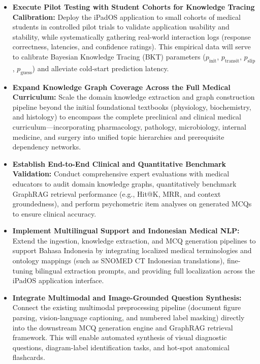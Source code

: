 \begin{itemize}
    \item \textbf{Execute Pilot Testing with Student Cohorts for Knowledge Tracing Calibration:}
          Deploy the iPadOS application to small cohorts of medical students in controlled pilot trials to validate application usability and stability, while systematically gathering real-world interaction logs (response correctness, latencies, and confidence ratings). This empirical data will serve to calibrate Bayesian Knowledge Tracing (BKT) parameters ($p_{\text{init}}$, $p_{\text{transit}}$, $p_{\text{slip}}$, $p_{\text{guess}}$) and alleviate cold-start prediction latency.

    \item \textbf{Expand Knowledge Graph Coverage Across the Full Medical Curriculum:}
          Scale the domain knowledge extraction and graph construction pipeline beyond the initial foundational textbooks (physiology, biochemistry, and histology) to encompass the complete preclinical and clinical medical curriculum---incorporating pharmacology, pathology, microbiology, internal medicine, and surgery into unified topic hierarchies and prerequisite dependency networks.

    \item \textbf{Establish End-to-End Clinical and Quantitative Benchmark Validation:}
          Conduct comprehensive expert evaluations with medical educators to audit domain knowledge graphs, quantitatively benchmark GraphRAG retrieval performance (e.g., Hit@K, MRR, and context groundedness), and perform psychometric item analyses on generated MCQs to ensure clinical accuracy.

    \item \textbf{Implement Multilingual Support and Indonesian Medical NLP:}
          Extend the ingestion, knowledge extraction, and MCQ generation pipelines to support Bahasa Indonesia by integrating localized medical terminologies and ontology mappings (such as SNOMED CT Indonesian translations), fine-tuning bilingual extraction prompts, and providing full localization across the iPadOS application interface.

    \item \textbf{Integrate Multimodal and Image-Grounded Question Synthesis:}
          Connect the existing multimodal preprocessing pipeline (document figure parsing, vision-language captioning, and numbered label masking) directly into the downstream MCQ generation engine and GraphRAG retrieval framework. This will enable automated synthesis of visual diagnostic questions, diagram-label identification tasks, and hot-spot anatomical flashcards.


\end{itemize}
